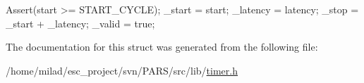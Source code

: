 \begin{DoxyCode}
                                                     {
                Assert(start >= START_CYCLE);
                _start = start;
            _latency = latency;
                _stop = _start + _latency;
            _valid = true;
        }
\end{DoxyCode}


The documentation for this struct was generated from the following file:\begin{DoxyCompactItemize}
\item 
/home/milad/esc\_\-project/svn/PARS/src/lib/\hyperlink{timer_8h}{timer.h}\end{DoxyCompactItemize}
